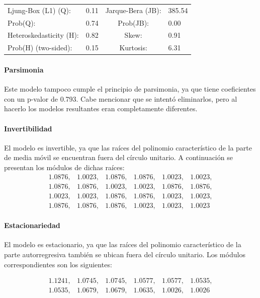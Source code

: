 \documentclass[12pt,letterpaper]{article}   %
\begin{document}
\begin{table}[htbp]
\vspace{0.3cm}

\begin{tabular}{llcl}
\toprule
Ljung-Box (L1) (Q): & 0.11 & Jarque-Bera (JB): & 385.54 \\
Prob(Q): & 0.74 & Prob(JB): & 0.00 \\
Heteroskedasticity (H): & 0.82 & Skew: & 0.91 \\
Prob(H) (two-sided): & 0.15 & Kurtosis: & 6.31 \\
\bottomrule
\end{tabular}

\end{table}


\paragraph{Parsimonia}
Este modelo tampoco cumple el principio de parsimonia, ya que tiene coeficientes con un p-valor de 0.793. Cabe mencionar que se intentó eliminarlos, pero al hacerlo los modelos resultantes eran completamente diferentes.

\paragraph{Invertibilidad}
El modelo es invertible, ya que las raíces del polinomio característico de la parte de media móvil se encuentran fuera del círculo unitario. A continuación se presentan los módulos de dichas raíces:
\[
\begin{array}{cccccc}
1.0876, & 1.0023, & 1.0876, & 1.0876, & 1.0023, & 1.0023, \\
1.0876, & 1.0876, & 1.0023, & 1.0023, & 1.0876, & 1.0876, \\
1.0023, & 1.0023, & 1.0876, & 1.0876, & 1.0023, & 1.0023, \\
1.0876, & 1.0876, & 1.0876, & 1.0023, & 1.0023, & 1.0023
\end{array}
\]

\paragraph{Estacionariedad}
El modelo es estacionario, ya que las raíces del polinomio característico de la parte autorregresiva también se ubican fuera del círculo unitario. Los módulos correspondientes son los siguientes:

\[
\begin{array}{cccccc}
1.1241, & 1.0745, & 1.0745, & 1.0577, & 1.0577, & 1.0535, \\
1.0535, & 1.0679, & 1.0679, & 1.0635, & 1.0026, & 1.0026
\end{array}
\]
\end{document}
